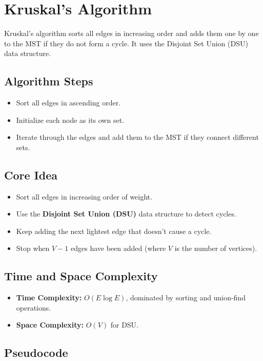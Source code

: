 \documentclass[14pt,a4paper]{extarticle}
\begin{document}
\section{Kruskal's Algorithm} 

Kruskal's\cite{kruskal1956} algorithm sorts all edges in increasing order and adds them one by one to the MST if 
they do not form a cycle. It uses the Disjoint Set Union (DSU) data structure.

\subsection{Algorithm Steps}
\begin{itemize}
    \item Sort all edges in ascending order.
    \item Initialize each node as its own set.
    \item Iterate through the edges and add them to the MST if they connect different sets.
\end{itemize}

\subsection{Core Idea}
\begin{itemize}
    \item Sort all edges in increasing order of weight.
    \item Use the \textbf{Disjoint Set Union (DSU)} data structure to detect cycles.
    \item Keep adding the next lightest edge that doesn't cause a cycle.
    \item Stop when \(V-1\) edges have been added (where \(V\) is the number of vertices).
\end{itemize}

\subsection*{Time and Space Complexity}
\begin{itemize}
    \item \textbf{Time Complexity:} \(O(E \log E)\), dominated by sorting and union-find operations.
    \item \textbf{Space Complexity:} \(O(V)\) for DSU.
\end{itemize}

\subsection{Pseudocode}
\end{document}
